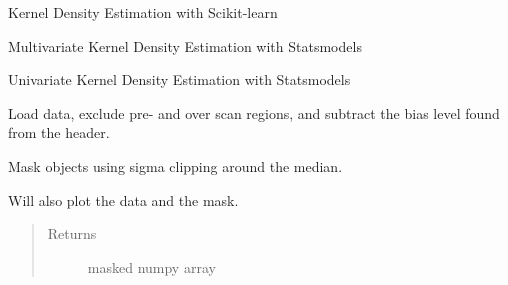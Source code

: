 \documentclass[a4paper,11pt,english]{sphinxmanual}
\begin{document}

\begin{fulllineitems}
\label{reduction:analysis.analyseBackground.kde_sklearn}
Kernel Density Estimation with Scikit-learn

\end{fulllineitems}


\begin{fulllineitems}
\label{reduction:analysis.analyseBackground.kde_statsmodels_m}
Multivariate Kernel Density Estimation with Statsmodels

\end{fulllineitems}


\begin{fulllineitems}
\label{reduction:analysis.analyseBackground.kde_statsmodels_u}
Univariate Kernel Density Estimation with Statsmodels

\end{fulllineitems}


\begin{fulllineitems}
\label{reduction:analysis.analyseBackground.loadData}
Load data, exclude pre- and over scan regions, and subtract the bias level found from the header.

\end{fulllineitems}


\begin{fulllineitems}
\label{reduction:analysis.analyseBackground.maskObjects}
Mask objects using sigma clipping around the median.

Will also plot the data and the mask.
\begin{quote}\begin{description}
\item[{Returns}] \leavevmode
masked numpy array

\end{description}\end{quote}

\end{fulllineitems}
\end{document}
